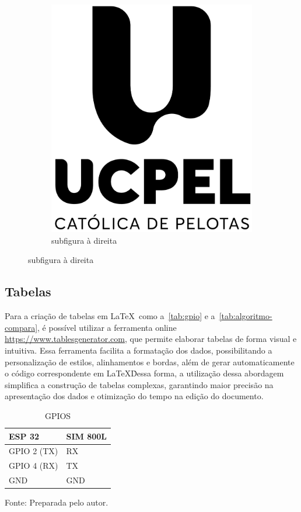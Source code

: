 \begin{figure}[!htbp]
\begin{subfigure}[b]{0.3\textwidth}
        \includegraphics[width=\textwidth]{img/logo_UCPEL_PRETO.png}
        \caption{\label{fig:subfig2} subfigura à direita}
    \end{subfigure}
\end{figure}

\subsection{Tabelas}

Para a criação de tabelas em \LaTeX\, como a~\autoref{tab:gpio} e a~\autoref{tab:algoritmo-compara}, é possível utilizar a ferramenta online \url{https://www.tablesgenerator.com}, que permite elaborar tabelas de forma visual e intuitiva. Essa ferramenta facilita a formatação dos dados, possibilitando a personalização de estilos, alinhamentos e bordas, além de gerar automaticamente o código correspondente em \LaTeX\. Dessa forma, a utilização dessa abordagem simplifica a construção de tabelas complexas, garantindo maior precisão na apresentação dos dados e otimização do tempo na edição do documento.

\begin{table}[!ht]
\centering
\footnotesize
\caption{GPIOS}
\label{tab:gpio}
\begin{tabular}{l|l}
\hline
ESP 32      & SIM 800L \\ \hline
GPIO 2 (TX) & RX       \\ \hline
GPIO 4 (RX) & TX       \\ \hline
GND         & GND      \\ \hline
\end{tabular}

\vspace*{3mm}
{\small Fonte: Preparada pelo autor.}     
\end{table}

